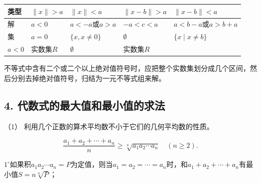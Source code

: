 {\def\LTcaptype{none} %
\begin{longtable}[]{@{}
  >{\raggedright\arraybackslash}p{}
  >{\raggedright\arraybackslash}p{}
  >{\raggedright\arraybackslash}p{}
  >{\raggedright\arraybackslash}p{}
  >{\raggedright\arraybackslash}p{}@{}}
\toprule\noalign{}
\begin{minipage}[b]{\linewidth}\raggedright
类型
\end{minipage} & \begin{minipage}[b]{\linewidth}\raggedright
\(\|x\| > a\)
\end{minipage} & \begin{minipage}[b]{\linewidth}\raggedright
\(\|x\| < a\)
\end{minipage} & \begin{minipage}[b]{\linewidth}\raggedright
\(\|x - b\| > a\)
\end{minipage} & \begin{minipage}[b]{\linewidth}\raggedright
\(\|x - b\| < a\)
\end{minipage} \\
\midrule\noalign{}
\endhead
\bottomrule\noalign{}
\endlastfoot
解 & \(a < 0\) & \(a < -a\)或\(a > a\) & \(-a < c < a\) &
\(a < b - a\)或\(a > b + a\) \\
集 & \(a = 0\) & \(\{x, x \neq 0\}\) & \(\emptyset\) &
\(\{x \mid x \neq b\}\) \\
\(a < 0\) & 实数集\(R\) & \(\emptyset\) & 实数集\(R\) & \\
\end{longtable}
}

不等式中含有二个或二个以上绝对值符号时，应把整个实数集划分成几个区间，然后分别去掉绝对值符号，归结为一元不等式组来解。

\subsection{4. 代数式的最大值和最小值的求法}

（1） 利用几个正数的算术平均数不小于它们的几何平均数的性质。

\[
\frac{a_{1} + a_{2} + \cdots + a_{n}}{n} \geqslant \sqrt[n]{a_{1} a_{2} \cdots a_{n}} \quad (n \geqslant 2).
\]

\(1^{\circ}\)如果积\(a_{1}a_{2}\cdots a_{n}=P\)为定值，则当\(a_{1}=a_{2}=\cdots=a_{n}\)时，和\(a_{1}+a_{2}+\cdots+a_{n}\)有最小值\(S=n\sqrt[n]{P}\)；

